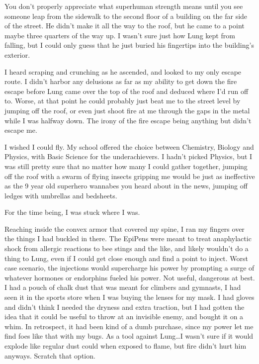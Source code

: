 





You don't properly appreciate what superhuman strength means until you see someone leap from the sidewalk to the second floor of a building on the far side of the street.  He didn't make it all the way to the roof, but he came to a point maybe three quarters of the way up.  I wasn't sure just how Lung kept from falling, but I could only guess that he just buried his fingertips into the building's exterior.



I heard scraping and crunching as he ascended, and looked to my only escape route.  I didn't harbor any delusions as far as my ability to get down the fire escape before Lung came over the top of the roof and deduced where I'd run off to.  Worse, at that point he could probably just beat me to the street level by jumping off the roof, or even just shoot fire at me through the gaps in the metal while I was halfway down.  The irony of the fire escape being anything but didn't escape me.



I wished I could fly.  My school offered the choice between Chemistry, Biology and Physics, with Basic Science for the underachievers.  I hadn't picked Physics, but I was still pretty sure that no matter how many I could gather together, jumping off the roof with a swarm of flying insects gripping me would be just as ineffective as the 9 year old superhero wannabes you heard about in the news, jumping off ledges with umbrellas and bedsheets.



For the time being, I was stuck where I was.



Reaching inside the convex armor that covered my spine, I ran my fingers over the things I had buckled in there.  The EpiPens were meant to treat anaphylactic shock from allergic reactions to bee stings and the like, and likely wouldn't do a thing to Lung, even if I could get close enough and find a point to inject.  Worst case scenario, the injections would supercharge his power by prompting a surge of whatever hormones or endorphins fueled his power.  Not useful, dangerous at best.  I had a pouch of chalk dust that was meant for climbers and gymnasts, I had seen it in the sports store when I was buying the lenses for my mask.  I had gloves and didn't think I needed the dryness and extra traction, but I had gotten the idea that it could be useful to throw at an invisible enemy, and bought it on a whim.  In retrospect, it had been kind of a dumb purchase, since my power let me find foes like that with my bugs.  As a tool against Lung\ldots I wasn't sure if it would explode like regular dust could when exposed to flame, but fire didn't hurt him anyways.  Scratch that option.




